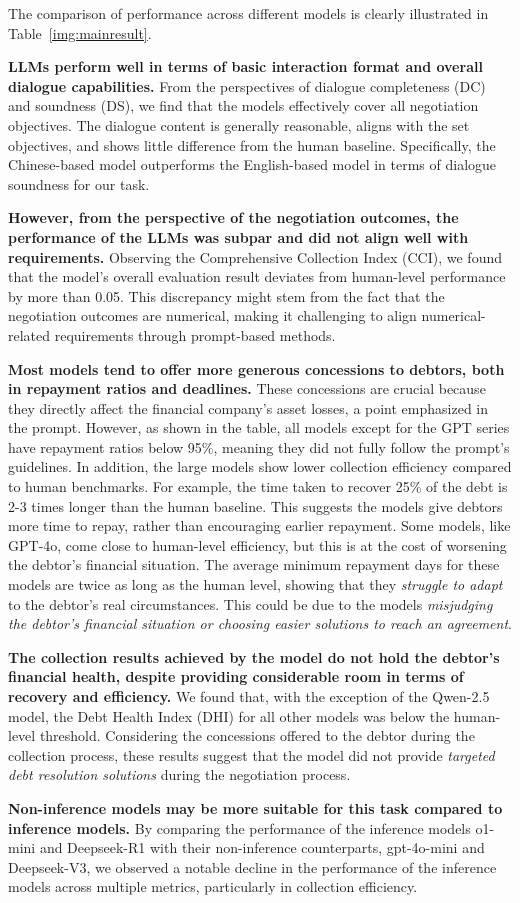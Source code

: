 The comparison of performance across different models is clearly illustrated in Table~\ref{img:mainresult}.

\textbf{LLMs perform well in terms of basic interaction format and overall dialogue capabilities.} From the perspectives of dialogue completeness (DC) and soundness (DS), we find that the models effectively cover all negotiation objectives. The dialogue content is generally reasonable, aligns with the set objectives, and shows little difference from the human baseline. Specifically, the Chinese-based model outperforms the English-based model in terms of dialogue soundness for our task.

\textbf{However, from the perspective of the negotiation outcomes, the performance of the LLMs was subpar and did not align well with requirements.} Observing the Comprehensive Collection Index (CCI), we found that the model’s overall evaluation result deviates from human-level performance by more than 0.05. This discrepancy might stem from the fact that the negotiation outcomes are numerical, making it challenging to align numerical-related requirements through prompt-based methods. 

\textbf{Most models tend to offer more generous concessions to debtors, both in repayment ratios and deadlines.} These concessions are crucial because they directly affect the financial company’s asset losses, a point emphasized in the prompt. However, as shown in the table, all models except for the GPT series have repayment ratios below 95\%, meaning they did not fully follow the prompt’s guidelines. In addition, the large models show lower collection efficiency compared to human benchmarks. For example, the time taken to recover 25\% of the debt is 2-3 times longer than the human baseline. This suggests the models give debtors more time to repay, rather than encouraging earlier repayment. Some models, like GPT-4o, come close to human-level efficiency, but this is at the cost of worsening the debtor’s financial situation. The average minimum repayment days for these models are twice as long as the human level, showing that they \textit{struggle to adapt} to the debtor’s real circumstances. This could be due to the models \textit{misjudging the debtor’s financial situation or choosing easier solutions to reach an agreement}.

\textbf{The collection results achieved by the model do not hold the debtor’s financial health, despite providing considerable room in terms of recovery and efficiency. }We found that, with the exception of the Qwen-2.5 model, the Debt Health Index (DHI) for all other models was below the human-level threshold. Considering the concessions offered to the debtor during the collection process, these results suggest that the model did not provide \textit{targeted debt resolution solutions} during the negotiation process.

\textbf{Non-inference models may be more suitable for this task compared to inference models.} By comparing the performance of the inference models o1-mini and Deepseek-R1 with their non-inference counterparts, gpt-4o-mini and Deepseek-V3, we observed a notable decline in the performance of the inference models across multiple metrics, particularly in collection efficiency.